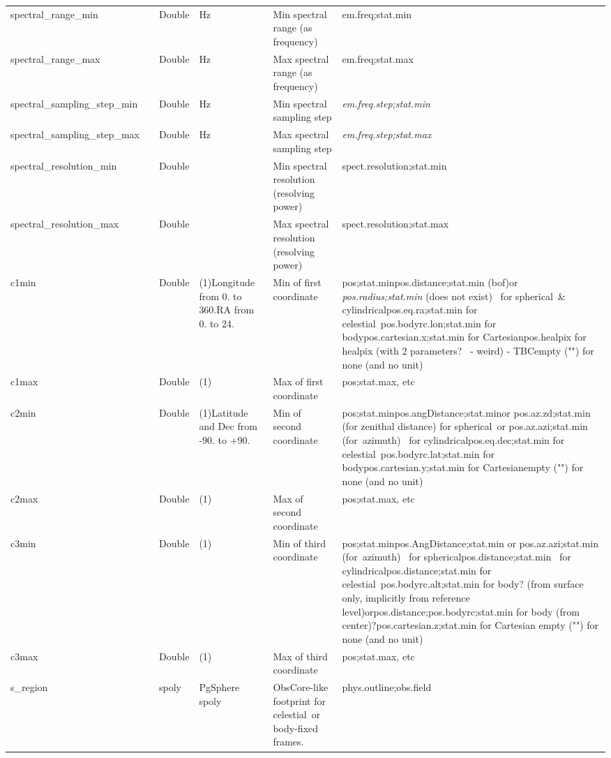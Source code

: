 \documentclass[11pt,a4paper]{ivoa}
\begin{document}
\begin{longtable}{p{3.5cm}p{0.5cm}p{1cm}p{1cm}p{7cm}p{3cm}}
\\
spectral\_range\_min&&Double&Hz&Min spectral range (as frequency)&em.freq;stat.min\\
spectral\_range\_max&&Double&Hz&Max spectral range (as frequency)&em.freq;stat.max\\
spectral\_sampling\_step\_min&&Double&Hz&Min spectral sampling step&\emph{em.freq.step;stat.min} \\
spectral\_sampling\_step\_max&&Double&Hz&Max spectral sampling step&\emph{em.freq.step;stat.max }\\
spectral\_resolution\_min&&Double&&Min spectral resolution (resolving power)&spect.resolution;stat.min\\
spectral\_resolution\_max&&Double&&Max spectral resolution (resolving power)&spect.resolution;stat.max\\
c1min&&Double&(1)Longitude from 0. to 360.RA from 0. to 24.&Min of first coordinate&pos;stat.minpos.distance;stat.min (bof)or \emph{pos.radius;stat.min} (does not exist)  for spherical \& cylindricalpos.eq.ra;stat.min for celestial pos.bodyrc.lon;stat.min for bodypos.cartesian.x;stat.min for Cartesianpos.healpix for healpix (with 2 parameters?  - weird) - TBCempty ("") for none (and no unit)\\
c1max&&Double&(1)&Max of first coordinate&pos;stat.max, etc\\
c2min&&Double&(1)Latitude and Dec from -90. to +90.&Min of second coordinate&pos;stat.minpos.angDistance;stat.minor pos.az.zd;stat.min (for zenithal distance) for spherical or pos.az.azi;stat.min (for azimuth)  for cylindricalpos.eq.dec;stat.min for celestial pos.bodyrc.lat;stat.min for bodypos.cartesian.y;stat.min for Cartesianempty ("") for none (and no unit)\\
c2max&&Double&(1)&Max of second coordinate&pos;stat.max, etc\\
c3min&&Double&(1)&Min of third coordinate&pos;stat.minpos.AngDistance;stat.min or pos.az.azi;stat.min (for azimuth)  for sphericalpos.distance;stat.min  for cylindricalpos.distance;stat.min for celestial pos.bodyrc.alt;stat.min for body? (from surface only, implicitly from reference level)orpos.distance;pos.bodyrc;stat.min for body (from center)?pos.cartesian.z;stat.min for Cartesian empty ("") for none (and no unit)\\
c3max&&Double&(1)&Max of third coordinate&pos;stat.max, etc\\
s\_region&&spoly&PgSphere spoly&ObsCore-like footprint for celestial or body-fixed frames.&phys.outline;obs.field\\

\end{longtable}
\end{document}
